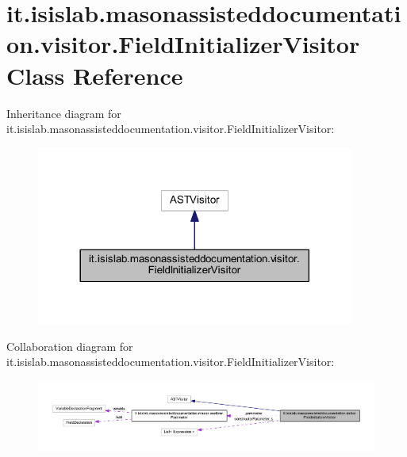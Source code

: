 \hypertarget{classit_1_1isislab_1_1masonassisteddocumentation_1_1visitor_1_1_field_initializer_visitor}{\section{it.\-isislab.\-masonassisteddocumentation.\-visitor.\-Field\-Initializer\-Visitor Class Reference}
\label{classit_1_1isislab_1_1masonassisteddocumentation_1_1visitor_1_1_field_initializer_visitor}
}


Inheritance diagram for it.\-isislab.\-masonassisteddocumentation.\-visitor.\-Field\-Initializer\-Visitor\-:\nopagebreak
\begin{figure}[H]
\begin{center}
\leavevmode
\includegraphics[width=296pt]{classit_1_1isislab_1_1masonassisteddocumentation_1_1visitor_1_1_field_initializer_visitor__inherit__graph}
\end{center}
\end{figure}


Collaboration diagram for it.\-isislab.\-masonassisteddocumentation.\-visitor.\-Field\-Initializer\-Visitor\-:\nopagebreak
\begin{figure}[H]
\begin{center}
\leavevmode
\includegraphics[width=350pt]{classit_1_1isislab_1_1masonassisteddocumentation_1_1visitor_1_1_field_initializer_visitor__coll__graph}
\end{center}
\end{figure}

